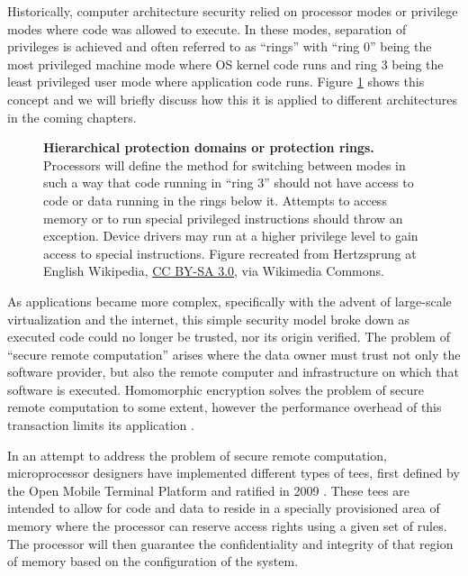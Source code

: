 Historically, computer architecture security relied on processor modes or privilege modes where code was allowed to execute. In these modes, separation of privileges is achieved and often referred to as ``rings'' with ``ring 0'' being the most privileged machine mode where OS kernel code runs and ring 3 being the least privileged user mode where application code runs. Figure \ref{fig:rings} shows this concept and we will briefly discuss how this it is applied to different architectures in the coming chapters.

\begin{figure}[t]
\centering

\caption[Protection Rings]{\textbf{Hierarchical protection domains or protection rings.} Processors will define the method for switching between modes in such a way that code running in ``ring 3'' should not have access to code or data running in the rings below it. Attempts to access memory or to run special privileged instructions should throw an exception. Device drivers may run at a higher privilege level to gain access to special instructions. Figure recreated from Hertzsprung at English Wikipedia, \href{http://creativecommons.org/licenses/by-sa/3.0/}{CC BY-SA 3.0}, via Wikimedia Commons.}
\label{fig:rings}
\end{figure}

As applications became more complex, specifically with the advent of large-scale virtualization and the internet, this simple security model broke down as executed code could no longer be trusted, nor its origin verified. The problem of ``secure remote computation'' arises where the data owner must trust not only the software provider, but also the remote computer and infrastructure on which that software is executed. Homomorphic encryption solves the problem of secure remote computation to some extent, however the performance overhead of this transaction limits its application \cite{gentryPhd}.

In an attempt to address the problem of secure remote computation, microprocessor designers have implemented different types of \glspl{tee}, first defined by the Open Mobile Terminal Platform and ratified in 2009 \cite{Confidential2009}. These \glspl{tee} are intended to allow for code and data to reside in a specially provisioned area of memory where the processor can reserve access rights using a given set of rules. The processor will then guarantee the confidentiality and integrity of that region of memory based on the configuration of the system.

